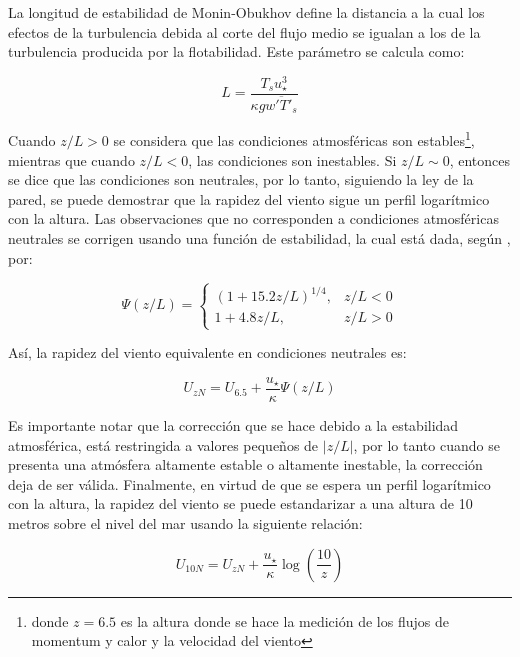 \documentclass[11pt]{article}
\begin{document}
La longitud de estabilidad de Monin-Obukhov define la distancia a la cual los
efectos de la turbulencia debida al corte del flujo medio se igualan a los de la
turbulencia producida por la flotabilidad. Este parámetro se calcula como:

\begin{equation}
  L = \frac{T_s u_\star^3}{\kappa g \overline{w'T'_s}}
\end{equation}

Cuando $z/L>0$ se considera que las condiciones atmosféricas son
estables\footnote{donde $z=6.5$ es la altura donde se hace la medición de los
flujos de momentum y calor y la velocidad del viento}, mientras que cuando
$z/L<0$, las condiciones son inestables. Si $z/L \sim 0$, entonces se dice que
las condiciones son neutrales, por lo tanto, siguiendo la ley de la pared, se
puede demostrar que la rapidez del viento sigue un perfil logarítmico con la
altura.  Las observaciones que no corresponden a condiciones atmosféricas
neutrales se corrigen usando una función de estabilidad, la cual está dada,
según \citet{Hogstrom1988}, por:

\begin{equation}
  \Psi(z/L) = \left\{
    \begin{array}{cc}
      (1 + 15.2 z/L)^{1/4}, & z/L < 0 \\
      1 + 4.8 z/L,          & z/L > 0
    \end{array}  
  \right.
\end{equation}

Así, la rapidez del viento equivalente en condiciones neutrales es:

\begin{equation}
  U_{zN} = U_{6.5} + \frac{u_\star}{\kappa}  \Psi (z/L)
\end{equation}

Es importante notar que la corrección que se hace debido a la estabilidad
atmosférica, está restringida a valores pequeños de $|z/L|$, por lo tanto cuando
se presenta una atmósfera altamente estable o altamente inestable, la corrección
deja de ser válida. Finalmente, en virtud de que se espera un perfil logarítmico
con la altura, la rapidez del viento se puede estandarizar a una altura de 10
metros sobre el nivel del mar usando la siguiente relación:

\begin{equation}
  U_{10N} = U_{zN} + \frac{u_\star}{\kappa} \log\left(\frac{10}{z}\right)
\end{equation}
\end{document}
